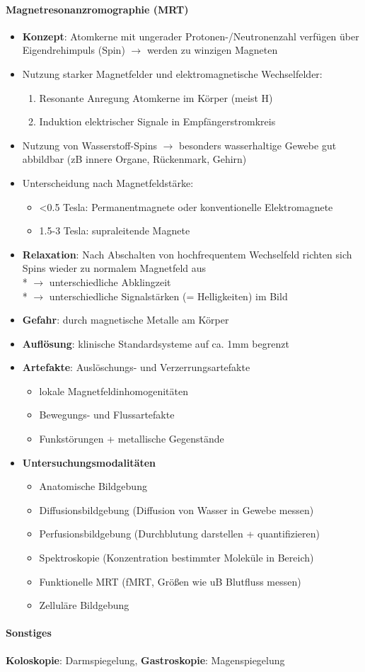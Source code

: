 \paragraph{Magnetresonanzromographie (MRT)}
\begin{itemize}
  \item \textbf{Konzept}: Atomkerne mit ungerader Protonen-/Neutronenzahl verfügen über Eigendrehimpuls (Spin) \( \to \) werden zu winzigen Magneten
  \item Nutzung starker Magnetfelder und elektromagnetische Wechselfelder:
  \begin{enumerate}
    \item Resonante Anregung Atomkerne im Körper (meist H)
    \item Induktion elektrischer Signale in Empfängerstromkreis
  \end{enumerate}
  \item Nutzung von Wasserstoff-Spins \( \to \) besonders wasserhaltige Gewebe gut abbildbar (zB innere Organe, Rückenmark, Gehirn)
  \item Unterscheidung nach Magnetfeldstärke:
  \begin{itemize}
    \item <0.5 Tesla: Permanentmagnete oder konventionelle Elektromagnete
    \item 1.5-3 Tesla: supraleitende Magnete
  \end{itemize}
  \item \textbf{Relaxation}: Nach Abschalten von hochfrequentem Wechselfeld richten sich Spins wieder zu normalem Magnetfeld aus \\* \( \to \) unterschiedliche Abklingzeit \\* \( \to \) unterschiedliche Signalstärken (= Helligkeiten) im Bild
  \item \textbf{Gefahr}: durch magnetische Metalle am Körper
  \item \textbf{Auflösung}: klinische Standardsysteme auf ca. 1mm begrenzt
  \item \textbf{Artefakte}: Auslöschungs- und Verzerrungsartefakte
  \begin{itemize}
      \item lokale Magnetfeldinhomogenitäten
      \item Bewegungs- und Flussartefakte
      \item Funkstörungen + metallische Gegenstände
  \end{itemize}
  \item \textbf{Untersuchungsmodalitäten}
  \begin{itemize}
    \item Anatomische Bildgebung
    \item Diffusionsbildgebung (Diffusion von Wasser in Gewebe messen)
    \item Perfusionsbildgebung (Durchblutung darstellen + quantifizieren)
    \item Spektroskopie (Konzentration bestimmter Moleküle in Bereich)
    \item Funktionelle MRT (fMRT, Größen wie uB Blutfluss messen)
    \item Zelluläre Bildgebung
  \end{itemize}
\end{itemize}

\paragraph{Sonstiges}
\textbf{Koloskopie}: Darmspiegelung, \textbf{Gastroskopie}: Magenspiegelung
